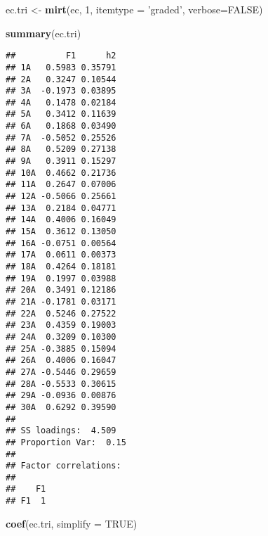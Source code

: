 \documentclass[]{article}
\newenvironment{Shaded}{\begin{snugshade}}{\end{snugshade}}
\newcommand{\KeywordTok}[1]{\textcolor[rgb]{0.13,0.29,0.53}{\textbf{#1}}}
\newcommand{\DataTypeTok}[1]{\textcolor[rgb]{0.13,0.29,0.53}{#1}}
\newcommand{\DecValTok}[1]{\textcolor[rgb]{0.00,0.00,0.81}{#1}}
\newcommand{\StringTok}[1]{\textcolor[rgb]{0.31,0.60,0.02}{#1}}
\newcommand{\OtherTok}[1]{\textcolor[rgb]{0.56,0.35,0.01}{#1}}
\newcommand{\NormalTok}[1]{#1}
\begin{document}
\begin{Shaded}
\begin{Highlighting}[]
\NormalTok{ec.tri <-}\StringTok{ }\KeywordTok{mirt}\NormalTok{(ec, }\DecValTok{1}\NormalTok{, }\DataTypeTok{itemtype =} \StringTok{'graded'}\NormalTok{, }\DataTypeTok{verbose=}\OtherTok{FALSE}\NormalTok{)}
\end{Highlighting}
\end{Shaded}

\begin{Shaded}
\begin{Highlighting}[]
\KeywordTok{summary}\NormalTok{(ec.tri)}
\end{Highlighting}
\end{Shaded}

\begin{verbatim}
##          F1      h2
## 1A   0.5983 0.35791
## 2A   0.3247 0.10544
## 3A  -0.1973 0.03895
## 4A   0.1478 0.02184
## 5A   0.3412 0.11639
## 6A   0.1868 0.03490
## 7A  -0.5052 0.25526
## 8A   0.5209 0.27138
## 9A   0.3911 0.15297
## 10A  0.4662 0.21736
## 11A  0.2647 0.07006
## 12A -0.5066 0.25661
## 13A  0.2184 0.04771
## 14A  0.4006 0.16049
## 15A  0.3612 0.13050
## 16A -0.0751 0.00564
## 17A  0.0611 0.00373
## 18A  0.4264 0.18181
## 19A  0.1997 0.03988
## 20A  0.3491 0.12186
## 21A -0.1781 0.03171
## 22A  0.5246 0.27522
## 23A  0.4359 0.19003
## 24A  0.3209 0.10300
## 25A -0.3885 0.15094
## 26A  0.4006 0.16047
## 27A -0.5446 0.29659
## 28A -0.5533 0.30615
## 29A -0.0936 0.00876
## 30A  0.6292 0.39590
## 
## SS loadings:  4.509 
## Proportion Var:  0.15 
## 
## Factor correlations: 
## 
##    F1
## F1  1
\end{verbatim}

\begin{Shaded}
\begin{Highlighting}[]
\KeywordTok{coef}\NormalTok{(ec.tri, }\DataTypeTok{simplify =} \OtherTok{TRUE}\NormalTok{)}
\end{Highlighting}
\end{Shaded}
\end{document}
